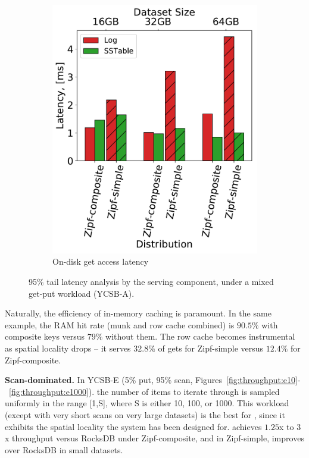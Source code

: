 \begin{figure}[htb]
\begin{subfigure}{0.49\linewidth}
\includegraphics[width=\textwidth]{figs/Latency_A.pdf}
\caption{On-disk get access latency}
\label{fig:readstat:lat}
\end{subfigure}
\caption{{\sys\/ 95\% tail latency analysis by the serving component, under a mixed get-put workload (YCSB-A).}}
\label{fig:readstat}
\end{figure}

Naturally, the efficiency of in-memory caching is paramount. In the same example, the RAM hit rate 
(munk and row cache combined) is 
$90.5\%$ with composite keys versus $79\%$ without them. The row cache becomes instrumental as spatial locality drops --
 it serves $32.8\%$ of gets for Zipf-simple versus $12.4\%$ for Zipf-composite. 

{\bf Scan-dominated.} In YCSB-E (5\% put, 95\% scan, Figures~\ref{fig:throughput:e10}-~\ref{fig:throughput:e1000}).
the number of items to iterate through is  
sampled uniformly in the range [1,S], where S is either 10, 100, or 1000. 
This workload (except with very short scans on very large datasets) is the best for \sys, since it exhibits the spatial locality the system has been designed for. 
\sys\/ achieves $1.25$x to $3$x throughput versus RocksDB under Zipf-composite, and in Zipf-simple, improves over RocksDB in small datasets. 
{}
 
